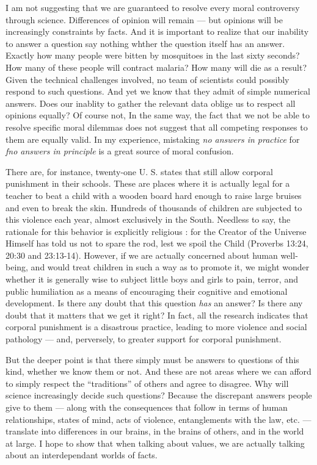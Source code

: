 \documentclass[a4paper,12pt]{extbook}
\begin{document}
I am not suggesting that we are guaranteed to resolve every moral controversy through science. 
Differences of opinion will remain --- but opinions will be increasingly constraints by facts. 
And it is important to realize that our inability to answer a question say nothing whther the question itself has an answer. 
Exactly how many people were bitten by mosquitoes in the last sixty seconds?
How many of these people will contract malaria?
How many will die as a result?
Given the technical challenges involved, no team of scientists could possibly respond to such questions. 
And yet we know that they admit of simple numerical answers. 
Does our inablity to gather the relevant data oblige us to respect all opinions equally?
Of course not,
In the same way, the fact that we not be able to resolve specific moral dilemmas does not suggest that all competing responses to them are equally valid. 
In my experience, mistaking \textit{no answers in practice} for \textit{fno answers in principle} is a great source of moral confusion. 

There are, for instance, twenty-one U. S. states that still allow corporal punishment in their schools. 
These are places where it is actually legal for a teacher to beat a child with a wooden board hard enough to raise large bruises and even to break the skin. 
Hundreds of thousands of children are subjected to this violence each year, almost exclusively in the South. 
Needless to say, the rationale for this behavior is explicitly religious :
for the Creator of the Universe Himself has told us not to spare the rod, lest we spoil the Child (Proverbs 13:24, 20:30 and 23:13-14). 
However, if we are actually concerned about human well-being, and would treat children in such a way as to promote it, we might wonder whether it is generally wise to subject little boys and girls to pain, terror, and public humiliation as a means of encouraging their cognitive and emotional development. 
Is there any doubt that this question \textit{has} an answer?
Is there any doubt that it matters that we get it right?
In fact, all the research indicates that corporal punishment is a disastrous practice, leading to more violence and social pathology --- and, perversely, to greater support for corporal punishment. 

But the deeper point is that there simply must be answers to questions of this kind, whether we know them or not. 
And these are not areas where we can afford to simply respect the ``traditions'' of others and agree to disagree. 
Why will science increasingly decide such questions?
Because the discrepant answers people give to them --- along with the consequences that follow in terms of human relationships, states of mind, acts of violence, entanglements with the law, etc. --- translate into differences in our brains, in the brains of others, and in the world at large. 
I hope to show that when talking about values, we are actually talking about an interdependant worlds of facts. 
\end{document}
